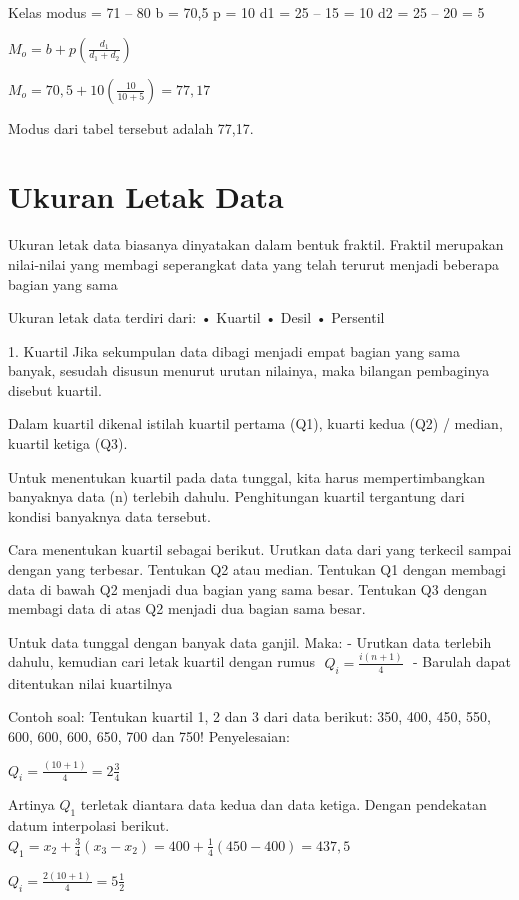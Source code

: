 \documentclass[11pt,fleqn]{book} %
\begin{document}
{Kelas modus = 71 – 80 
b = 70,5
p = 10
d1 = 25 – 15 = 10
d2 = 25 – 20 = 5

$M_{o} = b + p(\frac{d_{1}}{d_{1}+d_{2}})$

$M_{o} = 70,5 + 10(\frac{10}{10 + 5}) = 77,17$

Modus dari tabel tersebut adalah 77,17.


\section{Ukuran Letak Data}
Ukuran letak data biasanya dinyatakan dalam bentuk fraktil. Fraktil merupakan nilai-nilai yang membagi seperangkat data yang telah terurut menjadi beberapa bagian yang sama

Ukuran letak data terdiri dari:
•	Kuartil
•	Desil
•	Persentil

1.	Kuartil
Jika sekumpulan data dibagi menjadi empat bagian yang sama banyak, sesudah disusun menurut urutan nilainya, maka bilangan pembaginya disebut kuartil. 

Dalam kuartil dikenal istilah kuartil pertama (Q1), kuarti kedua (Q2) / median, kuartil ketiga (Q3).

Untuk menentukan kuartil pada data tunggal, kita harus mempertimbangkan banyaknya data (n) terlebih dahulu. Penghitungan kuartil tergantung dari kondisi banyaknya data tersebut. 

Cara menentukan kuartil sebagai berikut.
Urutkan data dari yang terkecil sampai dengan yang terbesar.
Tentukan Q2 atau median.
Tentukan Q1 dengan membagi data di bawah Q2 menjadi dua bagian yang sama besar.
Tentukan Q3 dengan membagi data di atas Q2 menjadi dua bagian sama besar.

Untuk data tunggal dengan banyak data ganjil. Maka:
-	Urutkan data terlebih dahulu, kemudian cari letak kuartil dengan rumus
$ 
$
$ Q_{i} = \frac{i(n+1)}{4} $
$ 
$
-	Barulah dapat ditentukan nilai kuartilnya

Contoh soal:
Tentukan kuartil 1, 2 dan 3 dari data berikut: 350, 400, 450, 550, 600, 600, 600, 650, 700 dan 750!
Penyelesaian:

$Q_{i} = \frac{(10+1)}{4} = 2\frac{3}{4}$ 

Artinya $Q_{1}$ terletak diantara data kedua dan data ketiga. Dengan pendekatan datum interpolasi berikut.
$Q_{1} = x_{2} + \frac{3}{4}(x_{3} - x_{2}) = 400 +\frac{1}{4}(450 -400) = 437,5$ 

$Q_{i} = \frac{2(10+1)}{4} = 5\frac{1}{2}$

}
\end{document}
